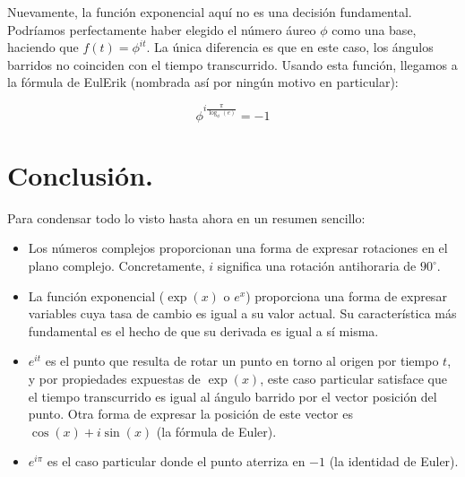Nuevamente, la función exponencial aquí no es una decisión fundamental. Podríamos perfectamente haber elegido el número áureo $\phi$ como una base, haciendo que $f(t) = \phi^{it}$. La única diferencia es que en este caso, los ángulos barridos no coinciden con el tiempo transcurrido. Usando esta función, llegamos a la fórmula de EulErik (nombrada así por ningún motivo en particular):

$$\phi^{i\frac{\pi}{\log_{\phi}(e)}} = -1$$

\section{Conclusión.}

Para condensar todo lo visto hasta ahora en un resumen sencillo:

\begin{itemize}
	\item Los números complejos proporcionan una forma de expresar rotaciones en el plano complejo. Concretamente, $i$ significa una rotación antihoraria de $90^{\circ}$.
	\item La función exponencial ($\exp(x)$ o $e^x$) proporciona una forma de expresar variables cuya tasa de cambio es igual a su valor actual. Su característica más fundamental es el hecho de que su derivada es igual a sí misma.
	\item $e^{it}$ es el punto que resulta de rotar un punto en torno al origen por tiempo $t$, y por propiedades expuestas de $\exp(x)$, este caso particular satisface que el tiempo transcurrido es igual al ángulo barrido por el vector posición del punto. Otra forma de expresar la posición de este vector es $\cos(x) + i\sin(x)$ (la fórmula de Euler).
	\item $e^{i\pi}$ es el caso particular donde el punto aterriza en $-1$ (la identidad de Euler).
\end{itemize}
